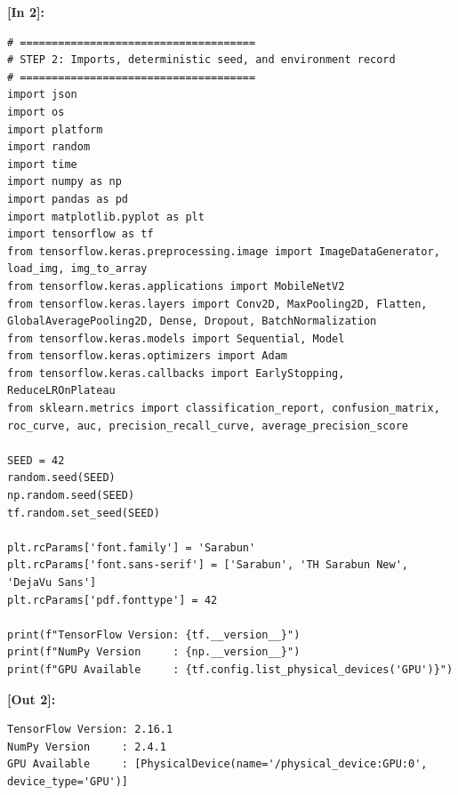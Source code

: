 \vspace{0.6em}
\noindent\textbf{\small [In 2]:}
\begin{lstlisting}[style=pycode]
# =====================================
# STEP 2: Imports, deterministic seed, and environment record
# =====================================
import json
import os
import platform
import random
import time
import numpy as np
import pandas as pd
import matplotlib.pyplot as plt
import tensorflow as tf
from tensorflow.keras.preprocessing.image import ImageDataGenerator, load_img, img_to_array
from tensorflow.keras.applications import MobileNetV2
from tensorflow.keras.layers import Conv2D, MaxPooling2D, Flatten, GlobalAveragePooling2D, Dense, Dropout, BatchNormalization
from tensorflow.keras.models import Sequential, Model
from tensorflow.keras.optimizers import Adam
from tensorflow.keras.callbacks import EarlyStopping, ReduceLROnPlateau
from sklearn.metrics import classification_report, confusion_matrix, roc_curve, auc, precision_recall_curve, average_precision_score

SEED = 42
random.seed(SEED)
np.random.seed(SEED)
tf.random.set_seed(SEED)

plt.rcParams['font.family'] = 'Sarabun'
plt.rcParams['font.sans-serif'] = ['Sarabun', 'TH Sarabun New', 'DejaVu Sans']
plt.rcParams['pdf.fonttype'] = 42

print(f"TensorFlow Version: {tf.__version__}")
print(f"NumPy Version     : {np.__version__}")
print(f"GPU Available     : {tf.config.list_physical_devices('GPU')}")\end{lstlisting}
\noindent\textbf{\small [Out 2]:}
\begin{lstlisting}[style=output]
TensorFlow Version: 2.16.1
NumPy Version     : 2.4.1
GPU Available     : [PhysicalDevice(name='/physical_device:GPU:0', device_type='GPU')]
\end{lstlisting}


